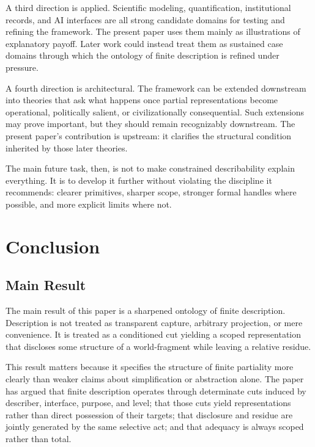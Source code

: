 \documentclass[11pt]{article}
\begin{document}
A third direction is applied. Scientific modeling, quantification, institutional records, and AI interfaces are all strong candidate domains for testing and refining the framework. The present paper uses them mainly as illustrations of explanatory payoff. Later work could instead treat them as sustained case domains through which the ontology of finite description is refined under pressure. \cite{frigg_hartmann_models_sep,espeland_stevens_quantification,bowker_star_sorting_things_out,mitchell_model_cards}

A fourth direction is architectural. The framework can be extended downstream into theories that ask what happens once partial representations become operational, politically salient, or civilizationally consequential. Such extensions may prove important, but they should remain recognizably downstream. The present paper's contribution is upstream: it clarifies the structural condition inherited by those later theories.

The main future task, then, is not to make constrained describability explain everything. It is to develop it further without violating the discipline it recommends: clearer primitives, sharper scope, stronger formal handles where possible, and more explicit limits where not.

\section{Conclusion}

\subsection{Main Result}

The main result of this paper is a sharpened ontology of finite description. Description is not treated as transparent capture, arbitrary projection, or mere convenience. It is treated as a conditioned cut yielding a scoped representation that discloses some structure of a world-fragment while leaving a relative residue.

This result matters because it specifies the structure of finite partiality more clearly than weaker claims about simplification or abstraction alone. The paper has argued that finite description operates through determinate cuts induced by describer, interface, purpose, and level; that those cuts yield representations rather than direct possession of their targets; that disclosure and residue are jointly generated by the same selective act; and that adequacy is always scoped rather than total. \cite{frigg_nguyen_scientific_representation_sep,chakravartty_scientific_realism_sep,ladyman_structural_realism_sep}
\end{document}
